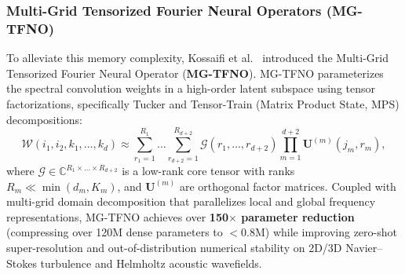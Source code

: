 \subsubsection{Multi-Grid Tensorized Fourier Neural Operators (MG-TFNO)}
To alleviate this memory complexity, Kossaifi et al.~\cite{kossaifi2024multigrid} introduced the Multi-Grid Tensorized Fourier Neural Operator (\textbf{MG-TFNO}). MG-TFNO parameterizes the spectral convolution weights in a high-order latent subspace using tensor factorizations, specifically Tucker and Tensor-Train (Matrix Product State, MPS) decompositions:
\begin{equation}
    \mathcal{W}(i_1, i_2, k_1, \dots, k_d) \approx \sum_{r_1=1}^{R_1} \dots \sum_{r_{d+2}=1}^{R_{d+2}} \mathcal{G}(r_1, \dots, r_{d+2}) \prod_{m=1}^{d+2} \mathbf{U}^{(m)}(j_m, r_m),
    \label{eq:tucker_fno}
\end{equation}
where $\mathcal{G} \in \mathbb{C}^{R_1 \times \dots \times R_{d+2}}$ is a low-rank core tensor with ranks $R_m \ll \min(d_m, K_m)$, and $\mathbf{U}^{(m)}$ are orthogonal factor matrices. Coupled with multi-grid domain decomposition that parallelizes local and global frequency representations, MG-TFNO achieves over \textbf{150$\times$ parameter reduction} (compressing over 120M dense parameters to $<0.8\text{M}$) while improving zero-shot super-resolution and out-of-distribution numerical stability on 2D/3D Navier--Stokes turbulence and Helmholtz acoustic wavefields.

